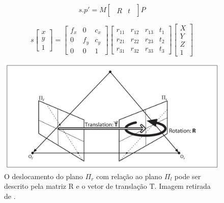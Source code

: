 \begin{equation}
  s.p' = M
  \begin{bmatrix}
  \begin{array}{c|c}
  R & t
  \end{array}
  \end{bmatrix}
  P 
\end{equation}

\begin{equation}
\label{projection_equation}
s
\begin{bmatrix}
x \\ 
y \\ 
1 
\end{bmatrix}
= 
\begin{bmatrix}
f_x & 0 & c_x\\ 
0 & f_y & c_y\\ 
0 & 0 & 1
\end{bmatrix} 
\begin{bmatrix}
r_{11} & r_{12} & r_{13} & t_1 \\ 
r_{21} & r_{22} & r_{23} & t_2 \\ 
r_{31} & r_{32} & r_{33} & t_3
\end{bmatrix}
\begin{bmatrix}
X \\ 
Y \\ 
Z \\ 
1
\end{bmatrix}
\end{equation}

\begin{figure}[H]
 	\centering
 	\includegraphics[scale=0.25]{./Resources/bradski/essential_geometry.png}
 	\caption{O deslocamento do plano $\Pi_r$ com relação ao plano $\Pi_l$ pode ser descrito pela matriz R e o vetor de translação T. Imagem retirada de \cite{Bradski2008}.}
 	\label{essential_geometry.png}
\end{figure}


